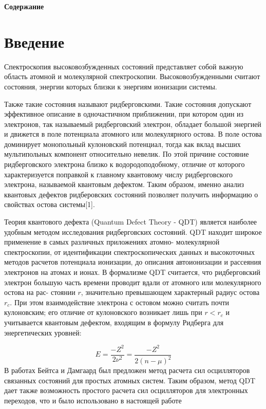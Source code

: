 \documentclass[a4paper]{article}
\title{}
\author{}
\date{2016-07-10}
\begin{document}
\clearpage\setcounter{page}{1}\pagestyle{Standard}


\textbf{Содержание}

\setcounter{tocdepth}{4}
\renewcommand\contentsname{}
\tableofcontents

\bigskip


\bigskip


\bigskip

\clearpage\section{Введение}
\hypertarget{RefHeading4667463868395}{}\hypertarget{Toc453749978}{}Спектроскопия
высоковозбужденных состояний представляет собой важную область атомной и молекулярной спектроскопии. Высоковозбужденными считают состояния, энергии которых близки к энергиям ионизации системы.

Также такие состояния называют ридберговскими.
Такие состоя\-ния
допускают эффективное описание в одночастичном приближении, при
ко\-тором один из
электронов, так называемый ридберговский электрон, обладает большой энергией и движется в поле потенциала атомного или молекулярного остова. В поле остова доминирует монопольный кулоновский потенциал, тогда как вклад высших мультипольных компонент относительно невелик. По этой причине состояние ридберговского электрона близко к водородоподобному, отличие от которого характеризуется поправкой к главному квантовому числу ридберговского электрона, называемой квантовым дефектом. Таким образом, именно анализ квантовых дефектов ридберовских состояний позволяет получить информацию о свойствах остова системы[1]. 

Теория квантового дефекта (Quantum Defect Theory - QDT) является наиболее удобным методом исследования ридберговских состояний. QDT находит широкое применение в самых различных приложениях атомно- молекулярной спектроскопии, от идентификации спектроскопических данных и высокоточных методов расчетов потенциала ионизации, до описания автоионизации и рассеяния электронов на атомах и ионах. В формализме QDT считается, что ридберговский электрон большую часть времени проводит вдали от атомного или молекулярного остова на рас-
стоянии  $r$,
значительно превышающем характерный
радиус остова  $r_c$. При
этом взаимодействие электрона с остовом можно считать почти кулоновским; его отличие от кулоновского возникает лишь при
 $r<r_c$ и учитывается
квантовым дефектом, входящим в формулу Ридберга для энергетических уровней:

\begin{equation*}
E=\frac{-Z^2}{2\nu ^2}=\frac{-Z^2}{2(n-\mu )^2}
\end{equation*}
В работах Бейтса и Дамгаард был предложен метод расчета сил осцилляторов связанных состояний для простых атомных систем. Таким образом, метод QDT дает также возможность простого расчета сил осцилляторов для электронных переходов, что и было использовано в настоящей работе
\end{document}
